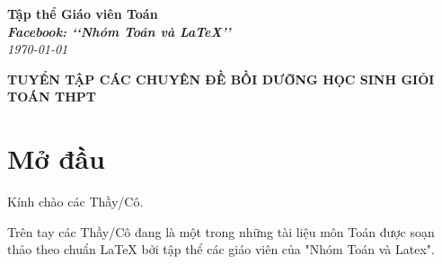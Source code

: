\documentclass[12pt,a4paper,oneside]{book}
\renewcommand{\baselinestretch}{1.4}
\theoremstyle{nonumberplain}
\begin{document}
	\providecommand*{\dx}{\ensuremath{\mathrm{\,d}}x}
	\providecommand*{\unit}[1]{\ensuremath{\mathrm{\,#1}}}
	
	\begin{titlepage}
		\begin{flushright}
			\fontsize{17}{0}\selectfont
			\textbf{Tập thể Giáo viên Toán}\\
			\textbf{\textit{Facebook: \lq\lq Nhóm Toán và LaTeX\rq\rq}}\\
			\textit{\color{red}\today}
		\end{flushright}
		
		\vspace{4cm}
		
		\begin{flushright}
			
			\vspace{1cm}
			
			\textbf{\fontsize{33}{0}\selectfont T\fontsize{29}{0}\selectfont UYỂN TẬP CÁC CHUYÊN ĐỀ BỒI DƯỠNG HỌC SINH GIỎI TOÁN THPT}
			
			\vspace{1cm}
			
		\end{flushright}
		
		\vfill{
		}
	\end{titlepage}
	\pagestyle{empty}
	\renewcommand{\headrulewidth}{0.4pt}
	
	{\renewcommand{\baselinestretch}{1.3}
		\tableofcontents
	}
	
	\pagestyle{fancy}
	\lhead{\empty}
	\rhead{\empty}
	\lfoot{\currfilename}
	\chapter*{Mở đầu}
	Kính chào các Thầy/Cô.
	
	\vspace{0.6cm}
	
	\noindent Trên tay các Thầy/Cô đang là một trong những tài liệu môn Toán được soạn thảo theo chuẩn \LaTeX{} bởi tập thể các giáo viên của "Nhóm Toán và Latex".

	
\newpage 
\newpage 
\newpage 
\newpage 
\newpage
\newpage
\newpage
\newpage
\newpage
\newpage
\newpage
\newpage
\newpage
\newpage
\newpage
\newpage
\newpage
\newpage
\newpage
\end{document}
